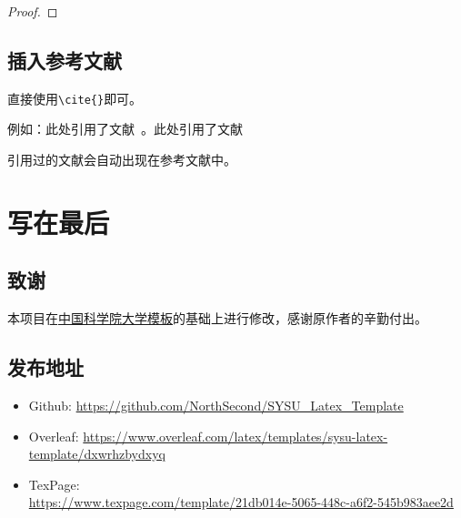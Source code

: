 \documentclass{CQMUReport}
\begin{document}
\begin{Example}
\end{Example}

\begin{proof}
\end{proof}

\subsection{插入参考文献}

直接使用\verb|\cite{}|即可。

例如：此处引用了文献~\cite{0Isaac}。此处引用了文献~\cite{2016The}

\par 引用过的文献会自动出现在参考文献中。

\section{写在最后}

\subsection{致谢}

本项目在\href{https://github.com/jweihe/UCAS_Latex_Template}{中国科学院大学模板}的基础上进行修改，感谢原作者的辛勤付出。

\subsection{发布地址}

\begin{itemize}
    \item Github: \url{https://github.com/NorthSecond/SYSU_Latex_Template}
    \item Overleaf: \url{https://www.overleaf.com/latex/templates/sysu-latex-template/dxwrhzbydxyq}
    \item TexPage: \\
          \url{https://www.texpage.com/template/21db014e-5065-448c-a6f2-545b983aee2d}
\end{itemize}


\newpage


\end{document}
